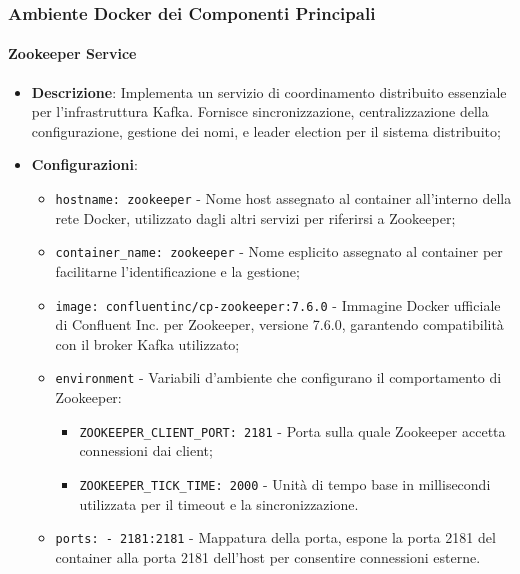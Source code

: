 \documentclass[10pt]{article}
\begin{document}
        \subsubsection{Ambiente Docker dei Componenti Principali}

        \paragraph{Zookeeper Service}
        \begin{itemize} 
        \item \textbf{Descrizione}: Implementa un servizio di coordinamento distribuito essenziale per l'infrastruttura Kafka. Fornisce sincronizzazione, centralizzazione della configurazione, gestione dei nomi, e leader election per il sistema distribuito;
        \item \textbf{Configurazioni}:
        \begin{itemize}
            \item \texttt{hostname: zookeeper} - Nome host assegnato al container all'interno della rete Docker, utilizzato dagli altri servizi per riferirsi a Zookeeper;
            \item \texttt{container\_name: zookeeper} - Nome esplicito assegnato al container per facilitarne l'identificazione e la gestione;
            \item \texttt{image: confluentinc/cp-zookeeper:7.6.0} - Immagine Docker ufficiale di Confluent Inc. per Zookeeper, versione 7.6.0, garantendo compatibilità con il broker Kafka utilizzato;
            \item \texttt{environment} - Variabili d'ambiente che configurano il comportamento di Zookeeper:
            \begin{itemize}
                \item \texttt{ZOOKEEPER\_CLIENT\_PORT: 2181} - Porta sulla quale Zookeeper accetta connessioni dai client;
                \item \texttt{ZOOKEEPER\_TICK\_TIME: 2000} - Unità di tempo base in millisecondi utilizzata per il timeout e la sincronizzazione.
            \end{itemize}
            \item \texttt{ports: - 2181:2181} - Mappatura della porta, espone la porta 2181 del container alla porta 2181 dell'host per consentire connessioni esterne.
        \end{itemize}


\end{itemize}
\end{document}
